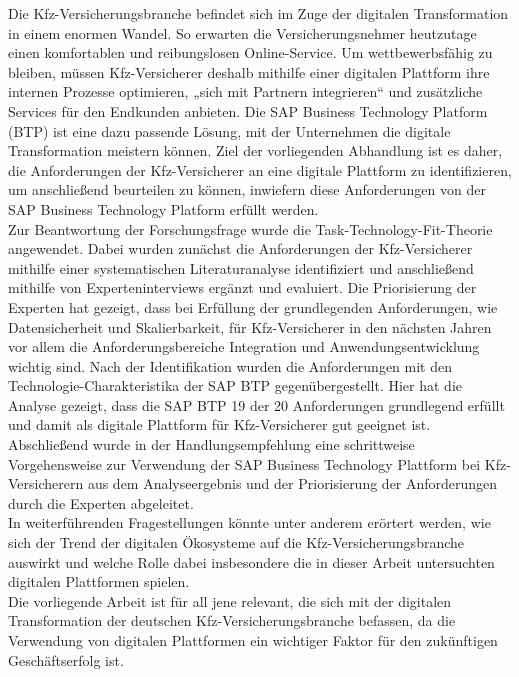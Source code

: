 Die Kfz-Versicherungsbranche befindet sich im Zuge der digitalen Transformation in einem enormen Wandel. So erwarten die Versicherungsnehmer heutzutage einen komfortablen und reibungslosen Online-Service. Um wettbewerbsfähig zu bleiben, müssen Kfz-Versicherer deshalb mithilfe einer digitalen Plattform ihre internen Prozesse optimieren, „sich mit Partnern integrieren“ und zusätzliche Services für den Endkunden anbieten. Die SAP Business Technology Platform (BTP) ist eine dazu passende Lösung, mit der Unternehmen die digitale Transformation meistern können. Ziel der vorliegenden Abhandlung ist es daher, die Anforderungen der Kfz-Versicherer an eine digitale Plattform zu identifizieren, um anschließend beurteilen zu können, inwiefern diese Anforderungen von der SAP Business Technology Platform erfüllt werden.\\
Zur Beantwortung der Forschungsfrage wurde die Task-Technology-Fit-Theorie angewendet. Dabei wurden zunächst die Anforderungen der Kfz-Versicherer mithilfe einer systematischen Literaturanalyse identifiziert und anschließend mithilfe von Experteninterviews ergänzt und evaluiert. Die Priorisierung der Experten hat gezeigt, dass bei Erfüllung der grundlegenden Anforderungen, wie Datensicherheit und Skalierbarkeit, für Kfz-Versicherer in den nächsten Jahren vor allem die Anforderungsbereiche Integration und Anwendungsentwicklung wichtig sind. Nach der Identifikation wurden die Anforderungen mit den Technologie-Charakteristika der SAP BTP gegenübergestellt. Hier hat die Analyse gezeigt, dass die SAP BTP 19 der 20 Anforderungen grundlegend erfüllt und damit als digitale Plattform für Kfz-Versicherer gut geeignet ist. Abschließend wurde in der Handlungsempfehlung eine schrittweise Vorgehensweise zur Verwendung der SAP Business Technology Plattform bei Kfz-Versicherern aus dem Analyseergebnis und der Priorisierung der Anforderungen durch die Experten abgeleitet.\\
In weiterführenden Fragestellungen könnte unter anderem erörtert werden, wie sich der Trend der digitalen Ökosysteme auf die Kfz-Versicherungsbranche auswirkt und welche Rolle dabei insbesondere die in dieser Arbeit untersuchten digitalen Plattformen spielen.\\
Die vorliegende Arbeit ist für all jene relevant, die sich mit der digitalen Transformation der deutschen Kfz-Versicherungsbranche befassen, da die Verwendung von digitalen Plattformen ein wichtiger Faktor für den zukünftigen Geschäftserfolg ist.







